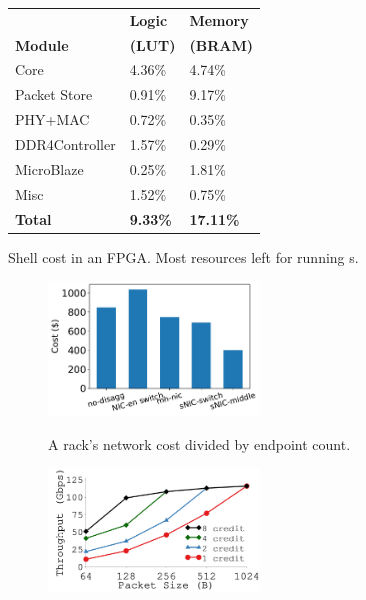 {
\begin{table}\small
\begin{center}
\begin{tabular}{ p{1.2in} | p{1in} |p{1in} }    
 & \textbf{Logic} & \textbf{Memory} \\    
\textbf{Module} & \textbf{(LUT)} & \textbf{(BRAM)} \\    
\hline    
\hline    
\snic{} Core & 4.36\%   & 4.74\% \\ 
Packet Store & 0.91\%   & 9.17\% \\
PHY+MAC      & 0.72\%   & 0.35\% \\
DDR4Controller         & 1.57\%   & 0.29\% \\
MicroBlaze   & 0.25\%   & 1.81\% \\
Misc         & 1.52\%   & 0.75\% \\
\hline
\textbf{Total}        & \textbf{9.33\%}   & \textbf{17.11\%} \\    
    
\end{tabular}    
{    
Shell cost in an FPGA. Most resources left for running \nt{}s.    
}
\end{center}
\end{table}
}
{
\begin{figure}[t]
\begin{center}
\centerline{\includegraphics[width=0.5\textwidth]{snic/Figures/fig-single-rack-capex-perDevCost.pdf}}
{
A rack's network cost divided by endpoint count. 
}
\end{center}
\end{figure}
}
{
\begin{figure}[h]
\begin{center}
\centerline{\includegraphics[width=0.5\textwidth]{snic/Figures/g_plot_credit.pdf}}
{
}
\end{center}
\end{figure}
}
